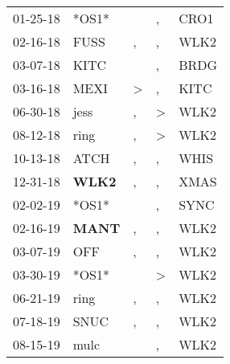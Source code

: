 \begin{supertabular}{p{0.07\textwidth}p{0.06\textwidth}p{0.02\textwidth}p{0.02\textwidth}p{0.06\textwidth}}
          01-25-18\textsuperscript{} &                            *OS1* &                  &             , &           CRO1\textsuperscript{} \\
          02-16-18\textsuperscript{} &           FUSS\textsuperscript{} &                , &             , &           WLK2\textsuperscript{} \\
          03-07-18\textsuperscript{} &           KITC\textsuperscript{} &                  &             , &           BRDG\textsuperscript{} \\
          03-16-18\textsuperscript{} &           MEXI\textsuperscript{} &     \textgreater &             , &           KITC\textsuperscript{} \\
          06-30-18\textsuperscript{} &           jess\textsuperscript{} &                , &  \textgreater &           WLK2\textsuperscript{} \\
          08-12-18\textsuperscript{} &           ring\textsuperscript{} &                , &  \textgreater &           WLK2\textsuperscript{} \\
          10-13-18\textsuperscript{} &           ATCH\textsuperscript{} &                , &             , &           WHIS\textsuperscript{} \\
          12-31-18\textsuperscript{} &  \textbf{WLK2\textsuperscript{}} &                , &             , &           XMAS\textsuperscript{} \\
          02-02-19\textsuperscript{} &                            *OS1* &                  &             , &           SYNC\textsuperscript{} \\
          02-16-19\textsuperscript{} &  \textbf{MANT\textsuperscript{}} &                , &             , &           WLK2\textsuperscript{} \\
          03-07-19\textsuperscript{} &            OFF\textsuperscript{} &                , &             , &           WLK2\textsuperscript{} \\
          03-30-19\textsuperscript{} &                            *OS1* &                  &  \textgreater &           WLK2\textsuperscript{} \\
          06-21-19\textsuperscript{} &           ring\textsuperscript{} &                , &             , &           WLK2\textsuperscript{} \\
          07-18-19\textsuperscript{} &           SNUC\textsuperscript{} &                , &             , &           WLK2\textsuperscript{} \\
          08-15-19\textsuperscript{} &           mulc\textsuperscript{} &                  &             , &           WLK2\textsuperscript{} \\

\end{supertabular}
